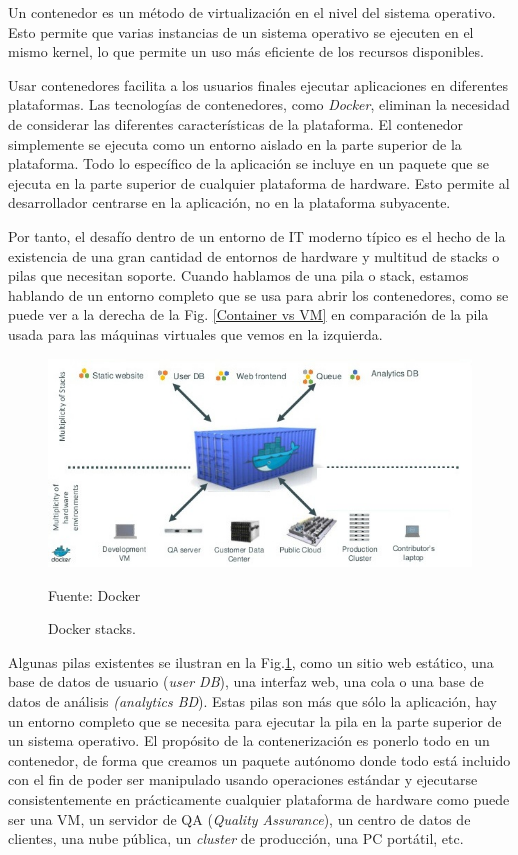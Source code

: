 Un contenedor es un método de virtualización en el nivel del sistema operativo. Esto permite que varias instancias de un sistema operativo se ejecuten en el mismo kernel, lo que permite un uso más eficiente de los recursos disponibles.

Usar contenedores  facilita a los usuarios finales ejecutar aplicaciones en diferentes plataformas. Las tecnologías de contenedores, como \textit{Docker}, eliminan la necesidad de considerar las diferentes características de la plataforma. El contenedor simplemente se ejecuta como un entorno aislado en la parte superior de la plataforma. Todo lo específico de la aplicación se incluye en un paquete que se ejecuta en la parte superior de cualquier plataforma de hardware. Esto permite al desarrollador centrarse en la aplicación, no en la plataforma subyacente.

Por  tanto, el desafío dentro de un entorno de IT moderno típico es el hecho de la existencia de una gran cantidad de entornos de hardware y multitud de stacks o pilas que necesitan soporte. Cuando hablamos de una pila  o stack, estamos hablando de un entorno completo que se usa para abrir los contenedores, como se puede ver a la derecha de la Fig. \ref{Container vs VM} en comparación de la pila usada para las máquinas virtuales que vemos en la izquierda. 

\begin{figure}
    \centering
    \includegraphics[width=1\textwidth]{imagenes/capitulo1/docker-stacks.png}
    \caption{Docker stacks.}
	\vspace{0.3cm}
    \footnotesize{Fuente: Docker }
    \label{Docker stacks}
\end{figure}

Algunas pilas existentes se ilustran en la Fig.\ref{Docker stacks}, como un sitio web estático, una base de datos de usuario (\textit{user DB}), una interfaz web, una cola o una base de datos de análisis \textit{(analytics BD}). Estas pilas son más que sólo la aplicación, hay un entorno completo que se necesita para ejecutar la pila en la parte superior de un sistema operativo. El propósito de la contenerización es ponerlo todo en un contenedor, de forma que creamos un paquete autónomo donde todo está incluido con el fin de poder ser manipulado usando operaciones estándar y ejecutarse consistentemente en prácticamente cualquier plataforma de hardware como puede ser una VM, un servidor de QA (\textit{Quality Assurance}), un centro de datos de clientes, una nube pública, un \textit{cluster} de producción, una PC portátil, etc.

